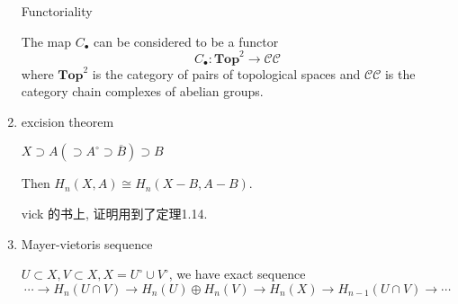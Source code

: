 \documentclass[UTF8]{ctexart}
\newcommand{\Top}{\mathbf{Top}}
\begin{document}
\begin{enumerate}
Functoriality

The map $C_{\bullet}$ can be considered to be a functor
\[
C_{\bullet} : \Top^2 \to \mathcal{CC}
\]
where $\Top^2$ is the category of pairs of topological spaces and $\mathcal{CC}$ is the category chain complexes of abelian groups.

\iffalse
Examples

One important use of relative homology is the computation of the homology groups of quotient spaces $X/A$. In the case that $A$ is a subspace of $X$ fulfilling the mild regularity condition that there exists a neighborhood of $A$ that has $A$ as a deformation retract, then the group $\tilde{H}_n(X/A)$(reduced homology) is isomorphic to $H_n(X,A)$. We can immediately use this fact to compute the homology of a sphere. We can realize $S^n$ as the quotient of an $n$-disk by its boundary, i.e. $S^n = D^n/S^{n-1}$. Applying the exact sequence of relative homology gives the following:
\[
0 \to C_{\bullet}(S^{n-1}) \to C_{\bullet}(D^n) \to C_{\bullet}(D^n)/C_{\bullet}(S^{n-1}) \to 0
\]
\[
\cdots\to H_i(D^n)\to H_i(D^n,S^{n-1})\to H_{i-1}(S^{n-1})\to H_{i-1}(D^n)\to\cdots
\]
Because the disk is contractible, we know its reduced homology groups vanish in all dimensions (Homology groups of all contractible topological spaces coincide with those of the point.), so the above sequence collapses to the short exact sequence:
\[
0\to H_i(D^n,S^{n-1})\to H_{i-1}(S^{n-1})\to 0
\]
Therefore, we get isomorphisms $H_i(D^n,S^{n-1}) \cong H_{i-1}(S^{n-1})$.

So we have
\[
\tilde{H}_i(S^n) = \tilde{H}_i(D^n/S^{n-1})\cong H_i(D^n,S^{n-1})\cong H_{i-1}(S^{n-1})
\]
\fi

\item excision theorem

$X \supset A (\supset A^{\circ} \supset \overline{B}) \supset B$

Then $H_n(X,A) \cong H_n(X-B,A-B)$.

vick 的书上\cite[p.47]{vick2012homology}, 证明用到了定理1.14\cite[p.20]{vick2012homology}.

\item Mayer-vietoris sequence

$U\subset X, V \subset X, X = U^{\circ} \cup V^{\circ}$, we have exact sequence
\[
\cdots\to H_n(U\cap V)\to H_n(U)\oplus H_n(V)\to H_n(X)\to H_{n-1}(U\cap V)\to\cdots
\]
\end{enumerate}
\end{document}
